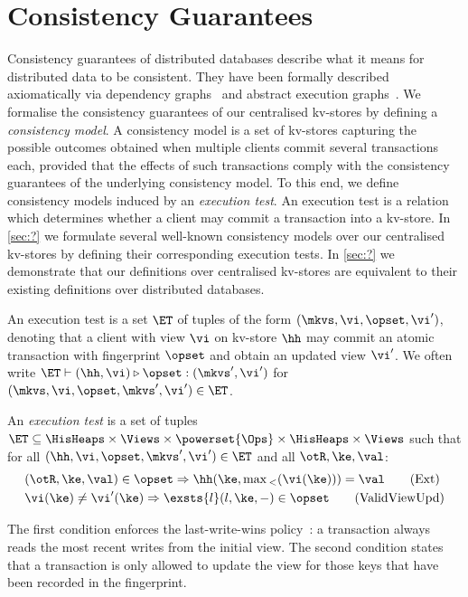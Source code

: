 \section{Consistency Guarantees}
\label{sec:cm}
Consistency guarantees of distributed databases describe
what it means for distributed data to be consistent. 
They have been formally described axiomatically via dependency graphs~\cite{adya-icde,adya}
and abstract execution graphs~\cite{.}. 
We formalise the consistency guarantees of our centralised kv-stores by defining a 
\emph{consistency model}. 
A consistency model is a set of kv-stores capturing the possible outcomes 
obtained when multiple clients commit several transactions each, 
provided that the effects of such transactions comply with the consistency guarantees of the underlying consistency model. 
To this end, we define consistency models induced by an \emph{execution test}.
An execution test is a relation which determines whether a client may commit a transaction into a kv-store.  
In \cref{sec:?} we formulate several well-known consistency models over our centralised kv-stores 
by defining their corresponding execution tests. 
In \cref{sec:?} we demonstrate that our definitions over centralised kv-stores are equivalent 
to their existing definitions over distributed databases.




An execution test is a set $\ET$ of tuples of the form $(\mkvs, \vi, \opset, \vi')$,
denoting that a client with view $\vi$ on kv-store $\hh$  may commit an atomic transaction 
with fingerprint $\opset$  and obtain an updated view $\vi'$. 
We often write
$\ET \vdash (\hh, \vi) \triangleright \opset: ( \mkvs', \vi')$ for
$(\mkvs, \vi, \opset, \mkvs', \vi') \in \ET$.


\begin{definition}
\label{def:execution.test}
An \emph{execution test} is a set of tuples $\ET \subseteq \HisHeaps \times \Views \times \powerset{\Ops} \times \HisHeaps \times \Views$ 
such that for all $(\hh, \vi, \opset, \mkvs', \vi') \in \ET$ and all $\otR, \ke, \val$:
\begin{align}
    & 
	(\otR, \ke, \val) \in \opset \Rightarrow
	\hh(\ke, \max{}_{<}(\vi(\ke))) = \val  
	\tag{Ext} \label{eq:read-external} \\
    & 
    \vi(\ke) \neq \vi'(\ke) 
    \Rightarrow
    \exsts{l} (l, \ke, -) \in \opset
    \tag{ValidViewUpd} \label{eq:valid-view-update}
\end{align}
\end{definition}
%
\noindent 
The first condition enforces the last-write-wins policy~\cite{}: 
a transaction always reads the most recent writes from the initial view.  
The second condition states that a transaction is only allowed to update the view for those keys 
that have been recorded in the fingerprint.  


